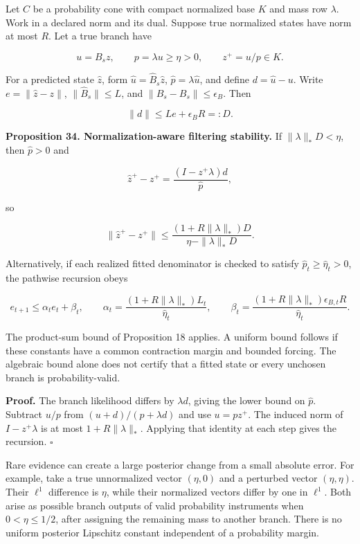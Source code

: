 \documentclass[11pt,letterpaper]{article}
\begin{document}
Let \(C\) be a probability cone with compact normalized base \(K\) and
mass row \(\lambda\). Work in a declared norm and its dual. Suppose true
normalized states have norm at most \(R\). Let a true branch have

\[
u=B_sz,\qquad p=\lambda u\geq\eta>0,\qquad z^+=u/p\in K.
\]

For a predicted state \(\widehat z\), form
\(\widehat u=\widehat B_s\widehat z\), \(\widehat p=\lambda\widehat u\),
and define \(d=\widehat u-u\). Write \(e=\|\widehat z-z\|\),
\(\|\widehat B_s\|\leq L\), and \(\|\widehat B_s-B_s\|\leq\epsilon_B\).
Then

\[
\|d\|\leq Le+\epsilon_BR=:D.
\]

\textbf{Proposition 34. Normalization-aware filtering stability.} If
\(\|\lambda\|_*D<\eta\), then \(\widehat p>0\) and

\[
\widehat z^+-z^+
=\frac{(I-z^+\lambda)d}{\widehat p},
\]

so

\[
\boxed{
\|\widehat z^+-z^+\|
\leq\frac{(1+R\|\lambda\|_*)D}{\eta-\|\lambda\|_*D}.
}
\]

Alternatively, if each realized fitted denominator is checked to satisfy
\(\widehat p_t\geq\widehat\eta_t>0\), the pathwise recursion obeys

\[
e_{t+1}\leq\alpha_te_t+\beta_t,\qquad
\alpha_t=\frac{(1+R\|\lambda\|_*)L_t}{\widehat\eta_t},\qquad
\beta_t=\frac{(1+R\|\lambda\|_*)\epsilon_{B,t}R}{\widehat\eta_t}.
\]

The product-sum bound of Proposition 18 applies. A uniform bound follows
if these constants have a common contraction margin and bounded forcing.
The algebraic bound alone does not certify that a fitted state or every
unchosen branch is probability-valid.

\textbf{Proof.} The branch likelihood differs by \(\lambda d\), giving
the lower bound on \(\widehat p\). Subtract \(u/p\) from
\((u+d)/(p+\lambda d)\) and use \(u=pz^+\). The induced norm of
\(I-z^+\lambda\) is at most \(1+R\|\lambda\|_*\). Applying that identity
at each step gives the recursion. \(\square\)

Rare evidence can create a large posterior change from a small absolute
error. For example, take a true unnormalized vector \((\eta,0)\) and a
perturbed vector \((\eta,\eta)\). Their \(\ell^1\) difference is
\(\eta\), while their normalized vectors differ by one in \(\ell^1\).
Both arise as possible branch outputs of valid probability instruments
when \(0<\eta\leq1/2\), after assigning the remaining mass to another
branch. There is no uniform posterior Lipschitz constant independent of
a probability margin.
\end{document}
